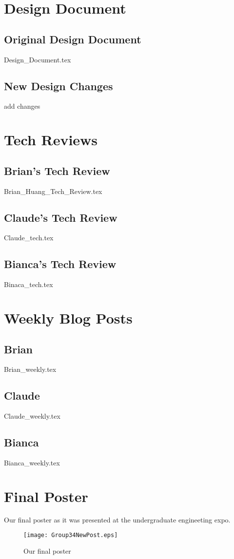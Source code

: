 \documentclass[onecolumn, draftclsnofoot,10pt, compsoc]{IEEEtran}
\begin{document}
	\section{Design Document}
	\subsection{Original Design Document}
	{Design_Document.tex}
	\subsection{New Design Changes}
	add changes	
	
	\section{Tech Reviews}
	\subsection{Brian's Tech Review}
	{Brian_Huang_Tech_Review.tex}
	\subsection{Claude's Tech Review}
	{Claude_tech.tex}
	\subsection{Bianca's Tech Review}
	{Binaca_tech.tex}
	
	\section{Weekly Blog Posts}
	
	\subsection{Brian}
	{Brian_weekly.tex}
	
	\subsection{Claude}
	{Claude_weekly.tex}
	
	\subsection{Bianca}
	{Bianca_weekly.tex}
	\newpage
	\section{Final Poster}	
		Our final poster as it was presented at the undergraduate engineeting expo. 	
		\begin{figure}[!hb]
			\centering
			\texttt{[image: Group34NewPost.eps]}
			\caption{Our final poster}
		\end{figure}
\end{document}
